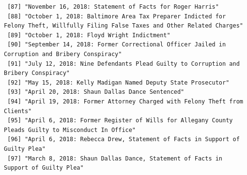 \documentclass[
  letterpaper,
  DIV=11,
  numbers=noendperiod]{scrreprt}
\begin{document}
\begin{verbatim}
 [87] "November 16, 2018: Statement of Facts for Roger Harris"                                                                                                                                                                                              
 [88] "October 1, 2018: Baltimore Area Tax Preparer Indicted for Felony Theft, Willfully Filing False Taxes and Other Related Charges"                                                                                                                      
 [89] "October 1, 2018: Floyd Wright Indictment"                                                                                                                                                                                                            
 [90] "September 14, 2018: Former Correctional Officer Jailed in Corruption and Bribery Conspiracy"                                                                                                                                                         
 [91] "July 12, 2018: Nine Defendants Plead Guilty to Corruption and Bribery Conspiracy"                                                                                                                                                                    
 [92] "May 15, 2018: Kelly Madigan Named Deputy State Prosecutor"                                                                                                                                                                                           
 [93] "April 20, 2018: Shaun Dallas Dance Sentenced"                                                                                                                                                                                                        
 [94] "April 19, 2018: Former Attorney Charged with Felony Theft from Clients"                                                                                                                                                                              
 [95] "April 6, 2018: Former Register of Wills for Allegany County Pleads Guilty to Misconduct In Office"                                                                                                                                                   
 [96] "April 6, 2018: Rebecca Drew, Statement of Facts in Support of Guilty Plea"                                                                                                                                                                           
 [97] "March 8, 2018: Shaun Dallas Dance, Statement of Facts in Support of Guilty Plea"                                                                                                                                                                     

\end{verbatim}
\end{document}
